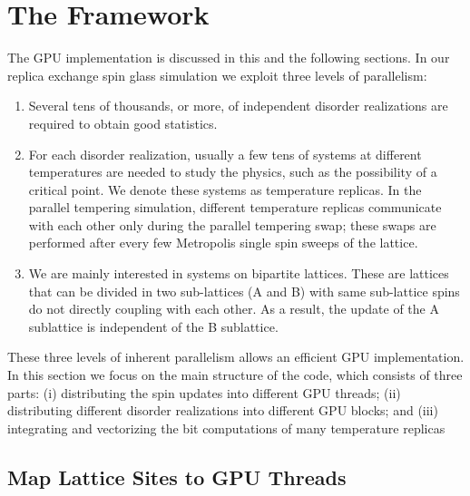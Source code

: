 \section{The Framework}

\label{section_framework}

The GPU implementation is discussed in this and the following sections. 
In our replica exchange spin glass simulation we exploit three levels of parallelism:
\begin{enumerate}
\item Several tens of thousands, or more,  of independent disorder realizations are required to 
obtain good statistics. 
\item For each disorder realization, usually a few tens of systems at different temperatures   
are needed to study the physics, such as the possibility of a critical point. We 
denote these systems as temperature replicas.   In the parallel 
tempering simulation, different temperature replicas  communicate with each other only during 
the parallel tempering swap; these swaps are performed after every few Metropolis single spin sweeps 
of the lattice. 
\item We are mainly interested in systems on bipartite lattices. These are lattices that can 
be divided in two sub-lattices (A and B) with same sub-lattice spins 
do not directly coupling with each other. As a result, the update of the A sublattice 
is independent of the B sublattice. 
\end{enumerate}
These three levels of inherent parallelism allows an efficient GPU
implementation. In this section we focus on the main
structure of the code, which consists of three parts: (i) distributing
the spin updates into different GPU threads; (ii) distributing 
different disorder realizations into different GPU
blocks; and (iii) integrating and vectorizing the bit computations
of many temperature replicas

\subsection{Map Lattice Sites to GPU Threads}

\label{section_framework_threads}

